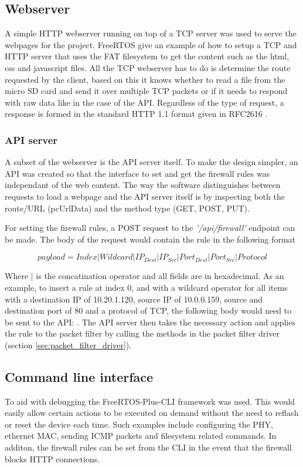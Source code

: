 \subsection{Webserver}
A simple HTTP webserver running on top of a TCP server was used to serve the webpages for the project. FreeRTOS give an example of how to setup a TCP and HTTP server that uses the FAT filesystem to get the content such as the html, css and javascript files. All the TCP webserver has to do is determine the route requested by the client, based on this it knows whether to read a file from the micro SD card and send it over multiple TCP packets or if it needs to respond with raw data like in the case of the API. Regardless of the type of request, a response is formed in the standard HTTP 1.1 format given in RFC2616 \cite{rfc2616}.


\subsubsection{API server}
A subset of the webserver is the API server itself. To make the design simpler, an API was created so that the interface to set and get the firewall rules was independant of the web content. The way the software distinguishes between requests to load a webpage and the API server itself is by inspecting both the route/URL (pcUrlData) and the method type (GET, POST, PUT).

For setting the firewall rules, a POST request to the \textit{'/api/firewall'} endpoint can be made. The body of the request would contain the rule in the following format

\[
payload=Index | Wildcard | IP_{Dest} |  IP_{Src}  | Port_{Dest} |  Port_{Src} | Protocol
\]

Where $|$ is the concatination operator and all fields are in hexadecimal. As an example, to insert a rule at index 0, and with a wildcard operator for all items with a destination IP of 10.20.1.120, source IP of 10.0.0.159, source and destination port of 80 and a protocol of TCP, the following body would need to be sent to the API: . The API server then takes the necessary action and applies the rule to the packet filter by calling the methods in the packet filter driver (section \ref{sec:packet_filter_driver}).



\subsection{Command line interface}

To aid with debugging the FreeRTOS-Plus-CLI framework was used. This would easily allow certain actions to be executed on demand without the need to reflash or reset the device each time. Such examples include configuring the PHY, ethernet MAC, sending ICMP packets and filesystem related commands. In additon, the firewall rules can be set from the CLI in the event that the firewall blocks HTTP connections. 
